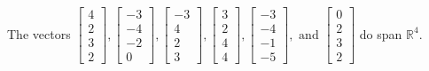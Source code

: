 \begin{exercise}
\begin{exerciseStatement}
  \end{exerciseStatement}
  \begin{exerciseAnswer}
   The vectors \(\left[\begin{array}{r}
4 \\
2 \\
3 \\
2
\end{array}\right] , \left[\begin{array}{r}
-3 \\
-4 \\
-2 \\
0
\end{array}\right] , \left[\begin{array}{r}
-3 \\
4 \\
2 \\
3
\end{array}\right] , \left[\begin{array}{r}
3 \\
2 \\
4 \\
4
\end{array}\right] , \left[\begin{array}{r}
-3 \\
-4 \\
-1 \\
-5
\end{array}\right] , \text{ and } \left[\begin{array}{r}
0 \\
2 \\
3 \\
2
\end{array}\right]\) 
  	 do  
	span \(\mathbb{R}^4\).
  


  \end{exerciseAnswer}
\end{exercise}